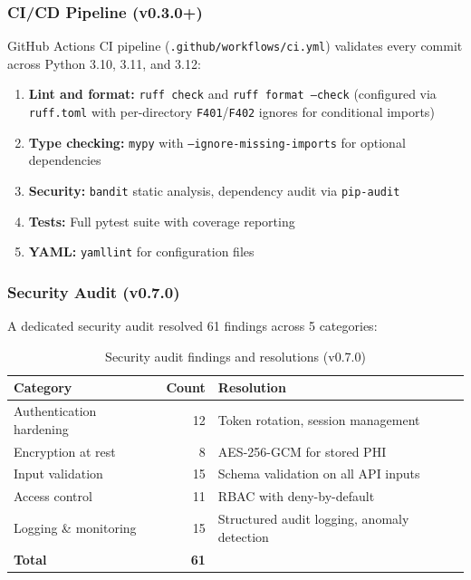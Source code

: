 \subsubsection{CI/CD Pipeline (v0.3.0+)}

GitHub Actions CI pipeline (\texttt{.github/workflows/ci.yml}) validates every commit across Python 3.10, 3.11, and 3.12:

\begin{enumerate}
  \item \textbf{Lint and format:} \texttt{ruff check} and \texttt{ruff format --check} (configured via \texttt{ruff.toml} with per-directory \texttt{F401}/\texttt{F402} ignores for conditional imports)
  \item \textbf{Type checking:} \texttt{mypy} with \texttt{--ignore-missing-imports} for optional dependencies
  \item \textbf{Security:} \texttt{bandit} static analysis, dependency audit via \texttt{pip-audit}
  \item \textbf{Tests:} Full pytest suite with coverage reporting
  \item \textbf{YAML:} \texttt{yamllint} for configuration files
\end{enumerate}

\subsubsection{Security Audit (v0.7.0)}

A dedicated security audit resolved 61 findings across 5 categories:

\begin{table}[H]
\centering
\caption{Security audit findings and resolutions (v0.7.0)}
\label{tab:security}
\small
\begin{tabular}{@{}lrl@{}}
\toprule
\textbf{Category} & \textbf{Count} & \textbf{Resolution} \\
\midrule
Authentication hardening & 12 & Token rotation, session management \\
Encryption at rest & 8 & AES-256-GCM for stored PHI \\
Input validation & 15 & Schema validation on all API inputs \\
Access control & 11 & RBAC with deny-by-default \\
Logging \& monitoring & 15 & Structured audit logging, anomaly detection \\
\midrule
\textbf{Total} & \textbf{61} & \\
\bottomrule
\end{tabular}
\end{table}

